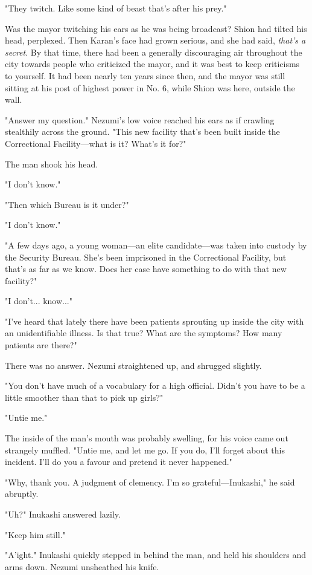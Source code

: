 "They twitch. Like some kind of beast that's after his prey."

Was the mayor twitching his ears as he was being broadcast? Shion had
tilted his head, perplexed. Then Karan's face had grown serious, and she
had said, \emph{that's a secret}. By that time, there had been a generally
discouraging air throughout the city towards people who criticized the
mayor, and it was best to keep criticisms to yourself. It had been
nearly ten years since then, and the mayor was still sitting at his post
of highest power in No. 6, while Shion was here, outside the wall.

"Answer my question." Nezumi's low voice reached his ears as if crawling
stealthily across the ground. "This new facility that's been built
inside the Correctional Facility---what is it? What's it for?"

The man shook his head.

"I don't know."

"Then which Bureau is it under?"

"I don't know."

"A few days ago, a young woman---an elite candidate---was taken into custody
by the Security Bureau. She's been imprisoned in the Correctional
Facility, but that's as far as we know. Does her case have something to
do with that new facility?"

"I don't... know..."

"I've heard that lately there have been patients sprouting up inside the
city with an unidentifiable illness. Is that true? What are the
symptoms? How many patients are there?"

There was no answer. Nezumi straightened up, and shrugged slightly.

"You don't have much of a vocabulary for a high official. Didn't you
have to be a little smoother than that to pick up girls?"

"Untie me."

The inside of the man's mouth was probably swelling, for his voice came
out strangely muffled. "Untie me, and let me go. If you do, I'll forget
about this incident. I'll do you a favour and pretend it never
happened."

"Why, thank you. A judgment of clemency. I'm so grateful---Inukashi," he
said abruptly.

"Uh?" Inukashi answered lazily.

"Keep him still."

"A'ight." Inukashi quickly stepped in behind the man, and held his
shoulders and arms down. Nezumi unsheathed his knife.

